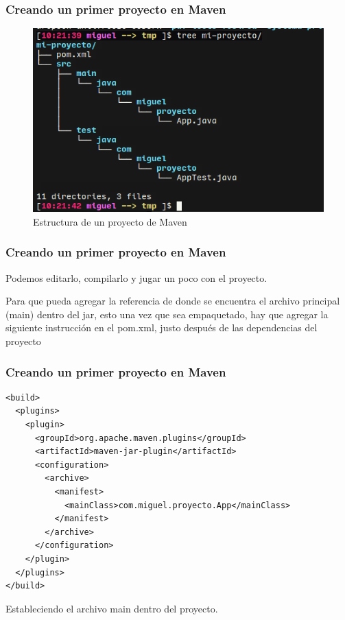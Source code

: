 \documentclass{beamer}
\begin{document}
\begin{frame}[fragile]
  \frametitle{Creando un primer proyecto en Maven}

  \begin{figure}[ht]
    \centering
    \includegraphics[scale=0.5]{figures/mvn1.png}
    \caption{\label{fig:maven1} Estructura de un proyecto de Maven}
  \end{figure}

\end{frame}

\begin{frame}
  \frametitle{Creando un primer proyecto en Maven}
  Podemos editarlo, compilarlo y jugar un poco con el proyecto.

  Para que pueda agregar la referencia de donde se encuentra el archivo principal
  (main) dentro del jar, esto una vez que sea empaquetado, hay que agregar la
  siguiente instrucción en el pom.xml, justo después de las dependencias del
  proyecto
\end{frame}

\begin{frame}[fragile]
  \frametitle{Creando un primer proyecto en Maven}

  \begin{verbatim}
<build>
  <plugins>
	<plugin>
	  <groupId>org.apache.maven.plugins</groupId>
	  <artifactId>maven-jar-plugin</artifactId>
	  <configuration>
		<archive>
		  <manifest>
			<mainClass>com.miguel.proyecto.App</mainClass>
		  </manifest>
		</archive>
	  </configuration>
	</plugin>
  </plugins>
</build>
\end{verbatim}

Estableciendo el archivo main dentro del proyecto.


\end{frame}
\end{document}
